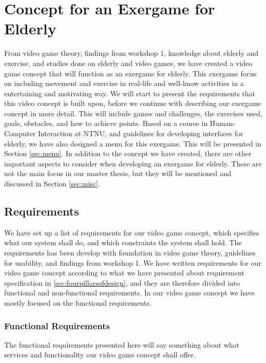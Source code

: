 \chapter{Concept for an Exergame for Elderly}
From video game theory, findings from workshop 1, knowledge about elderly and exercise, and studies done on elderly and video games, we have created a video game concept that will function as an exergame for elderly. This exergame focus on including movement and exercise in real-life and well-know activities in a entertaining and motivating way. We will start to present the requirements that this video concept is built upon, before we continue with describing our exergame concept in more detail. This will include games and challenges, the exercises used, goals, obstacles, and how to achieve points. Based on a course in Human-Computer Interaction at NTNU, and guidelines for developing interfaces for elderly, we have also designed a menu for this exergame. This will be presented in Section \ref{sec:menu}. In addition to the concept we have created, there are other important aspects to consider when developing an exergame for elderly. These are not the main focus in our master thesis, but they will be mentioned and discussed in Section \ref{sec:misc}.

\section{Requirements}
\label{sec:req}
We have set up a list of requirements for our video game concept, which specifies what our system shall do, and which constraints the system shall hold. The requirements has been develop with foundation in video game theory, guidelines for usability, and findings from workshop 1. We have written requirements for our video game concept according to what we have presented about requirement specification in \ref{sec:fourpillarsofdesign}, and they are therefore divided into functional and non-functional requirements. In our video game concept we have mostly focused on the functional requirements.

\subsection{Functional Requirements}
The functional requirements presented here will say something about what services and functionality our video game concept shall offer.

